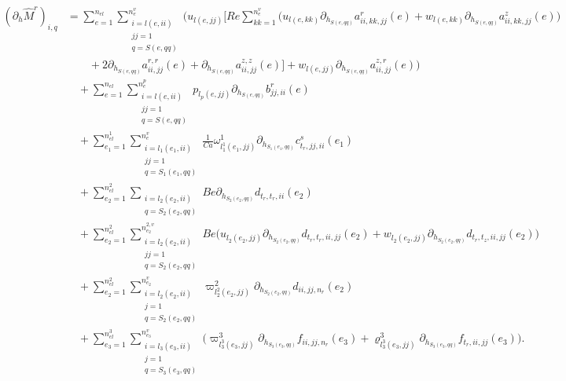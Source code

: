 \documentclass{article}
\begin{document}
\begin{align}
\left(\partial_h \hat{M}^r\right)_{i,q} &= 
\sum_{e=1}^{n_{el}} \sum_{\substack{i=l(e,ii)\\ jj=1\\ q=S(e,qq)}}^{n_e^v} \Bigg( u_{l(e,jj)} \Bigg[ Re \sum_{kk=1}^{n_e^v} \big( u_{l(e,kk)} \partial_{h_{S(e,qq)}} a_{ii,kk,jj}^r(e) + w_{l(e,kk)} \partial_{h_{S(e,qq)}} a_{ii,kk,jj}^z(e) \big) \nonumber\\
&\qquad + 2 \partial_{h_{S(e,qq)}} a_{ii,jj}^{r,r}(e) + \partial_{h_{S(e,qq)}} a_{ii,jj}^{z,z}(e) \Bigg] + w_{l(e,jj)} \partial_{h_{S(e,qq)}} a_{ii,jj}^{z,r}(e) \Bigg) \nonumber\\
&\quad + \sum_{e=1}^{n_{el}} \sum_{\substack{i=l(e,ii)\\ jj=1\\ q=S(e,qq)}}^{n_e^p} p_{l_p(e,jj)} \partial_{h_{S(e,qq)}} b_{jj,ii}^r(e) \nonumber\\
&\quad + \sum_{e_1=1}^{n_{el}^1} \sum_{\substack{i=l_1(e_1,ii)\\ jj=1\\ q=S_1(e_1,qq)}}^{n_e^v} \frac{1}{Ca} \omega_{l_1^1(e_1,jj)}^1 \partial_{h_{S_1(e_1,qq)}} c_{t_r,jj,ii}^s(e_1) \nonumber\\
&\quad + \sum_{e_2=1}^{n_{el}^2} \sum_{\substack{i=l_2(e_2,ii)\\ q=S_2(e_2,qq)}} Be \partial_{h_{S_2(e_2,qq)}} d_{t_r,t_r,ii}(e_2) \nonumber\\
&\quad + \sum_{e_2=1}^{n_{el}^2} \sum_{\substack{i=l_2(e_2,ii)\\ jj=1\\ q=S_2(e_2,qq)}}^{n_{e_2}^{2,v}} Be \Big( u_{l_2(e_2,jj)} \partial_{h_{S_2(e_2,qq)}} d_{t_r,t_r,ii,jj}(e_2) + w_{l_2(e_2,jj)} \partial_{h_{S_2(e_2,qq)}} d_{t_r,t_z,ii,jj}(e_2) \Big) \nonumber\\
&\quad + \sum_{e_2=1}^{n_{el}^2} \sum_{\substack{i=l_2(e_2,ii)\\ j=1\\ q=S_2(e_2,qq)}}^{n_{e_2}^v} \varpi_{l_2^2(e_2,jj)}^2 \partial_{h_{S_2(e_2,qq)}} d_{ii,jj,n_r}(e_2) \nonumber\\
&\quad + \sum_{e_3=1}^{n_{el}^3} \sum_{\substack{i=l_3(e_3,ii)\\ j=1\\ q=S_3(e_3,qq)}}^{n_{e_3}^v} \Big( \varpi_{l_3^3(e_3,jj)}^3 \partial_{h_{S_3(e_3,qq)}} f_{ii,jj,n_r}(e_3) + \varrho_{l_3^3(e_3,jj)}^3 \partial_{h_{S_3(e_3,qq)}} f_{t_r,ii,jj}(e_3) \Big). \tag{18.8}
\end{align}
\end{document}
